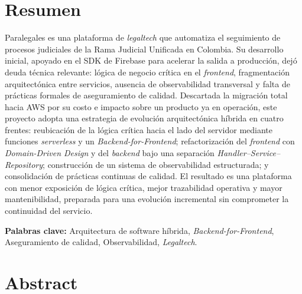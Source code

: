 \section*{Resumen}

Paralegales es una plataforma de \textit{legaltech} que automatiza el seguimiento de procesos judiciales de la Rama Judicial Unificada en Colombia. Su desarrollo inicial, apoyado en el SDK de Firebase para acelerar la salida a producción, dejó deuda técnica relevante: lógica de negocio crítica en el \textit{frontend}, fragmentación arquitectónica entre servicios, ausencia de observabilidad transversal y falta de prácticas formales de aseguramiento de calidad. Descartada la migración total hacia AWS por su costo e impacto sobre un producto ya en operación, este proyecto adopta una estrategia de evolución arquitectónica híbrida en cuatro frentes: reubicación de la lógica crítica hacia el lado del servidor mediante funciones \textit{serverless} y un \textit{Backend-for-Frontend}; refactorización del \textit{frontend} con \textit{Domain-Driven Design} y del \textit{backend} bajo una separación \textit{Handler--Service--Repository}; construcción de un sistema de observabilidad estructurada; y consolidación de prácticas continuas de calidad. El resultado es una plataforma con menor exposición de lógica crítica, mejor trazabilidad operativa y mayor mantenibilidad, preparada para una evolución incremental sin comprometer la continuidad del servicio.

\vspace{1em}

\textbf{Palabras clave:} Arquitectura de software híbrida, \textit{Backend-for-Frontend}, Aseguramiento de calidad, Observabilidad, \textit{Legaltech}.

\newpage

\begingroup
{}

\section*{Abstract}

